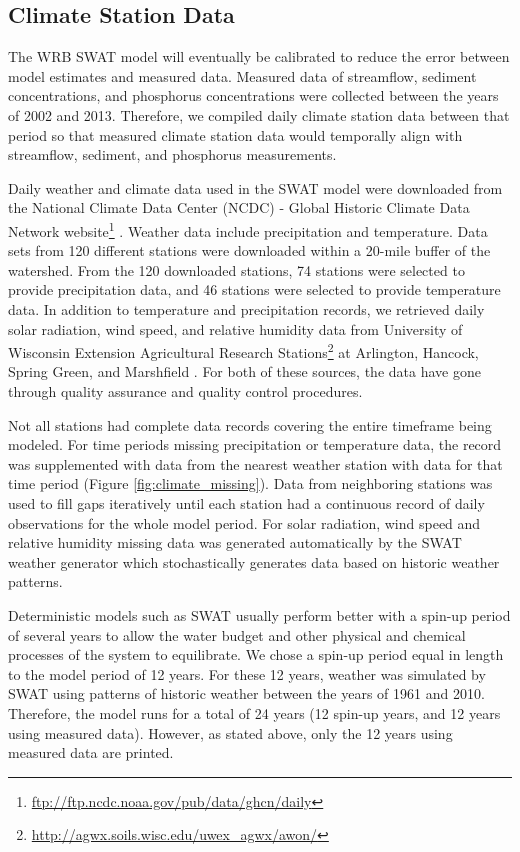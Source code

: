 \subsection{Climate Station Data}\label{sec:climate_data}

The WRB SWAT model will eventually be calibrated to reduce the error between model estimates and measured data. Measured data of streamflow, sediment concentrations, and phosphorus concentrations were collected between the years of 2002 and 2013. Therefore, we compiled daily climate station data between that period so that measured climate station data would temporally align with streamflow, sediment, and phosphorus measurements.

Daily weather and climate data used in the SWAT model were downloaded from the National Climate Data Center (NCDC) - Global Historic Climate Data Network website\footnote{\url{ftp://ftp.ncdc.noaa.gov/pub/data/ghcn/daily}} \citep{ncdc_ghcn_2012}. 
Weather data include precipitation and temperature.  
Data sets from 120 different stations were downloaded within a 20-mile buffer of the watershed. From the 120 downloaded stations, 74 stations were selected to provide precipitation data, and 46 stations were selected to provide temperature data. 
In addition to temperature and precipitation records, we retrieved daily solar radiation, wind speed, and relative humidity data from University of Wisconsin Extension Agricultural Research Stations\footnote{\url{http://agwx.soils.wisc.edu/uwex_agwx/awon/}} at Arlington, Hancock, Spring Green, and Marshfield . 
For both of these sources, the data have gone through quality assurance and quality control procedures.

Not all stations had complete data records covering the entire timeframe being modeled.  For time periods missing precipitation or temperature data, the record was supplemented with data from the nearest weather station with data for that time period (Figure \ref{fig:climate_missing}). Data from neighboring stations was used to fill gaps iteratively until each station had a continuous record of daily observations for the whole model period. For solar radiation, wind speed and relative humidity missing data was generated automatically by the SWAT weather generator which stochastically generates data based on historic weather patterns.

Deterministic models such as SWAT usually perform better with a spin-up period of several years to allow the water budget and other physical and chemical processes of the system to equilibrate. We chose a spin-up period equal in length to the model period of 12 years. For these 12 years, weather was simulated by SWAT using patterns of historic weather between the years of 1961 and 2010. Therefore, the model runs for a total of 24 years (12 spin-up years, and 12 years using measured data). However, as stated above, only the 12 years using measured data are printed.

